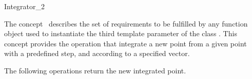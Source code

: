 

\begin{ccRefFunctionObjectConcept}{Integrator_2}


\ccDefinition
  
The concept \ccRefName\ describes the set of requirements to be
fulfilled by any function object used to instantiate the third
template parameter of the class
.  This concept provides
the operation that integrate a new point from a given point with a
predefined step, and according to a specified vector.


\ccTypes
{}
\ccGlue
{}
\ccGlue
{}
\ccGlue

\ccCreation
{}  %
\ccGlue

\ccOperations
{}
The following operations return the new integrated point.
\ccGlue
{}
\ccGlue

\ccHasModels
{} \\
 \\
\end{ccRefFunctionObjectConcept}


